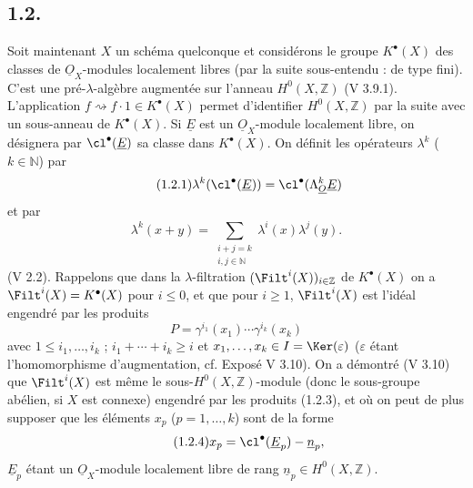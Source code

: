 
\subsection*{1.2.}
Soit maintenant $X$ un schéma quelconque et considérons le groupe $K^{\bullet}(X)$ des classes de $\underline{O}_X$-modules localement libres (par la suite sous-entendu : de type fini). C'est une pré-$\lambda$-algèbre augmentée sur l'anneau $H^0(X,\mathbb Z)$ (V 3.9.1). L'application $f\rightsquigarrow f\cdot1\in K^{\bullet}(X)$ permet d'identifier $H^0(X,\mathbb Z)$ par la suite avec un sous-anneau de $K^{\bullet}(X)$. Si $\underline{E}$ est un $\underline{O}_X$-module localement libre, on désignera par $\cl^{\bullet}(\underline{E})$ sa classe dans $K^{\bullet}(X)$. On définit les opérateurs $\lambda^k$ ($k\in\mathbb N$) par
\begin{equation}\tag{1.2.1}
\lambda^k(\cl^{\bullet}(\underline{E}))=\cl^{\bullet}(\Lambda_{\underline{O}}^k\underline{E})
\end{equation}
et par
\begin{equation}\tag{1.2.2}
\lambda^k(x+y)=\sum_{\substack{i+j=k\\ i,j\in\mathbb N}}\lambda^i(x)\lambda^j(y).
\end{equation}
(V 2.2). Rappelons que dans la $\lambda$-filtration $(\Filt^i(X))_{i\in\mathbb Z}$ de $K^{\bullet}(X)$ on a $\Filt^i(X)=K^{\bullet}(X)$ pour $i\leq0$, et que pour $i\geq1$, $\Filt^i(X)$ est l'idéal engendré par les produits
\begin{equation}\tag{1.2.3}
P=\gamma^{i_1}(x_1)\cdots\gamma^{i_k}(x_k)
\end{equation}
avec $1\leq i_1,\ldots,i_k$ ; $i_1+\cdots+i_k\geq i$ et $x_1,\ldots,x_k\in I=\Ker(\varepsilon)$ ($\varepsilon$ étant l'homomorphisme d'augmentation, cf. Exposé V 3.10). On a démontré (V 3.10) que $\Filt^i(X)$ est même le sous-$H^0(X,\mathbb Z)$-module (donc le sous-groupe abélien, si $X$ est connexe) engendré par les produits (1.2.3), et où on peut de plus supposer que les éléments $x_p$ ($p=1,\ldots,k$) sont de la forme
\begin{equation}\tag{1.2.4}
x_p=\cl^{\bullet}(\underline{E}_p)-\underline{n}_p,
\end{equation}
$\underline{E}_p$ étant un $\underline{O}_X$-module localement libre de rang $\underline{n}_p\in H^0(X,\mathbb Z)$.

